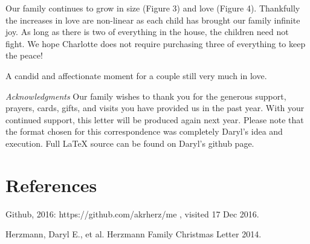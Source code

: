 \documentclass{article}
\makeatletter
\def\refer{\par\noindent\hangindent\parindent\hangafter1}
\newenvironment{figurehere}
  {\def\@captype{figure}}
  {}
\makeatother
\begin{document}
\begin{multicols}{2}
Our family continues to grow in size (Figure 3) and love (Figure 4). Thankfully
the increases in love are non-linear as each child has brought our family
infinite joy.  As long as there is two of everything in the house, the children
need not fight.  We hope Charlotte does not require purchasing three of
everything to keep the peace!

\bigskip

\begin{figurehere}
 \centering   
 \caption{A candid and affectionate moment for a couple still very much in
 love.}
\end{figurehere}

\bigskip
  \emph{Acknowledgments} Our family wishes to thank you for the generous 
support, prayers, cards, gifts, and visits you have provided us in the past
year. With your continued support, this letter will be produced again
next year. Please note that the format chosen for this correspondence was
completely Daryl's idea and execution. Full \LaTeX\xspace source can be found on 
Daryl's github page.

\section{References}

\refer Github, 2016: https://github.com/akrherz/me , visited 17 Dec 2016.
\refer Herzmann, Daryl E., et al. Herzmann Family Christmas Letter 2014. 

\end{multicols}
\end{document}
